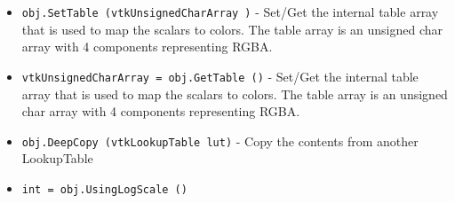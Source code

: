 \begin{itemize}
\item  \verb|obj.SetTable (vtkUnsignedCharArray )| -  Set/Get the internal table array that is used to map the scalars
 to colors.  The table array is an unsigned char array with 4
 components representing RGBA.

\item  \verb|vtkUnsignedCharArray = obj.GetTable ()| -  Set/Get the internal table array that is used to map the scalars
 to colors.  The table array is an unsigned char array with 4
 components representing RGBA.

\item  \verb|obj.DeepCopy (vtkLookupTable lut)| -  Copy the contents from another LookupTable

\item  \verb|int = obj.UsingLogScale ()|

\end{itemize}
